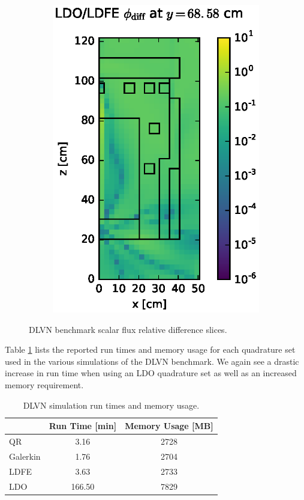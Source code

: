 \documentclass{article} %
\begin{document}
\begin{figure}[!hbt]
\begin{subfigure}{0.4\textwidth}
\includegraphics[max height=0.445\textheight]
{dlvn-flux-diff-ldfe.eps}
\end{subfigure}
\caption{DLVN benchmark scalar flux relative difference slices.}
\label{dlvn-fwd-diff-rel}
\end{figure}

Table \ref{dlvn-stats} lists the reported run times and memory usage for each
quadrature set used in the various simulations of the DLVN benchmark. We again
see a drastic increase in run time when using an LDO quadrature set as well as
an increased memory requirement.

\begin{table}[!htb]
\centering
\caption{DLVN simulation run times and memory usage.}
\label{dlvn-stats}
\begin{tabular}{l|cc}
              & Run Time [min]       & Memory Usage [MB]      \\ \hline
QR            & 3.16 & 2728         \\
Galerkin      & 1.76 & 2704         \\
LDFE          & 3.63 & 2733         \\
LDO           & 166.50 & 7829
\end{tabular}
\end{table}
\end{document}
